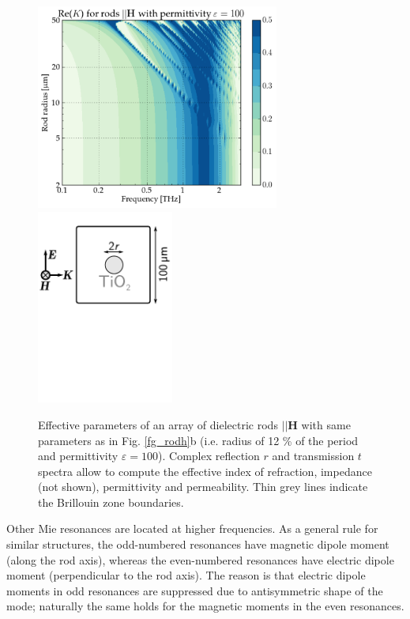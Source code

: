 {{\begin{figure}[ht]  \caption{Effective parameters of an array of dielectric rods $||\mathbf H$ with same parameters as in Fig. \ref{fg_rodh}b (i.e. radius of  12 \% of the period and permittivity $\varepsilon = 100$). Complex reflection $r$ and transmission $t$ spectra allow to compute the effective index of refraction, impedance (not shown), permittivity and permeability. Thin grey lines indicate the Brillouin zone boundaries.}
\label{fg_rodh_fdtd} \centering 
\includegraphics[width=8cm]{img/old/HRods_eps100_radiusscan.pdf}
\includegraphics[width=4.5cm]{img/HRods_sketch.pdf}
\end{figure}

Other Mie resonances are located at higher frequencies. As a general rule for similar structures, the odd-numbered resonances have magnetic dipole moment (along the rod axis), whereas the even-numbered resonances have electric dipole moment (perpendicular to the rod axis). The reason is that electric dipole moments in odd resonances are suppressed due to antisymmetric shape of the mode; naturally the same holds for the magnetic moments in the even resonances.

}}
